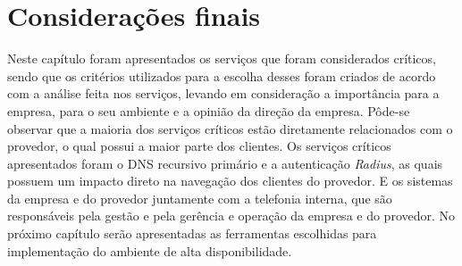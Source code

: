 \section{Considerações finais}

Neste capítulo foram apresentados os serviços que foram considerados críticos, sendo que os critérios utilizados para a escolha desses foram 
criados de acordo com a análise feita nos serviços, levando em consideração a importância para a empresa, para o seu ambiente e a opinião da 
direção da empresa. Pôde-se observar que a maioria dos serviços críticos estão diretamente relacionados com o provedor, o qual possui a maior
parte dos clientes. Os serviços críticos apresentados foram o \ac{DNS} recursivo primário e a autenticação \textit{Radius}, as quais possuem
um impacto direto na navegação dos clientes do provedor. E os sistemas da empresa e do provedor juntamente com a telefonia interna, que 
são responsáveis pela gestão e pela gerência e operação da empresa e do provedor.
No próximo capítulo serão apresentadas as ferramentas escolhidas para implementação do ambiente de alta disponibilidade. 
